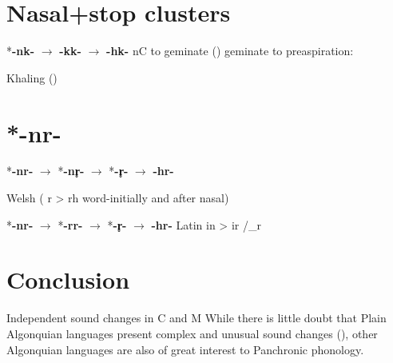 \documentclass[oneside,a4paper,11pt]{article}
\newcommand{\ipa}[1]{{\phon\mbox{\textbf{#1}}}}
\begin{document}
 
 
  \section{Nasal+stop clusters}
*\ipa{-nk-} $\rightarrow$ \ipa{-kk-} $\rightarrow$ \ipa{-hk-} 
nC to geminate (\citealt{jouon06})
geminate to preaspiration: 
  \citealt[172]{kuemmel07wandel}
  \citealt{silverman03preaspirated}
  
  Khaling (\citealt[44]{jacques16tonogenesis})
  
 \section{*-nr-}
*\ipa{-nr-} $\rightarrow$ *\ipa{-nr̥-} $\rightarrow$ *\ipa{-r̥-} $\rightarrow$ \ipa{-hr-} 

Welsh (\citealt[145]{kuemmel07wandel} r > rh word-initially and after nasal)
\citet[471-480]{jackson56early} \citet{schrijver95}

*\ipa{-nr-} $\rightarrow$ *\ipa{-rr-} $\rightarrow$ *\ipa{-r̥-} $\rightarrow$ \ipa{-hr-} 
Latin in > ir /\_r
\citet{blevins16voiceless.sonorants}

\section{Conclusion}
Independent sound changes in C and M
While there is little doubt that Plain Algonquian languages present complex and unusual sound changes (\citealt{goddard74arapaho,goddard88cheyenne.y,proulx89bf}),  other Algonquian languages are also of great interest to Panchronic phonology. 


\end{document}
